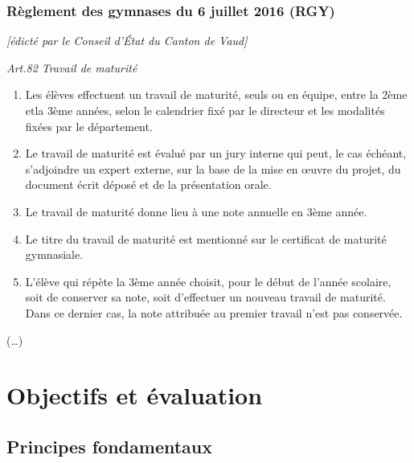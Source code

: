 \documentclass[
  10pt,
  french,
  a5paper,
  openany]{book}
\providecommand{\tightlist}{%
  \setlength{\itemsep}{0pt}\setlength{\parskip}{0pt}}
\begin{document}

\clearpage

\hypertarget{ruxe8glement-des-gymnases-du-6-juillet-2016-rgy}{%
\subsection*{Règlement des gymnases du 6 juillet 2016 (RGY)}\label{ruxe8glement-des-gymnases-du-6-juillet-2016-rgy}}

\emph{{[}édicté par le Conseil d'État du Canton de Vaud{]}}

\emph{Art.82 Travail de maturité}

\begin{enumerate}
\def\labelenumi{\arabic{enumi}.}
\tightlist
\item
  Les élèves effectuent un travail de maturité, seuls ou en équipe, entre la 2ème etla 3ème années, selon le calendrier fixé par le directeur et les modalités fixées par le département.
\item
  Le travail de maturité est évalué par un jury interne qui peut, le cas échéant, s'adjoindre un expert externe, sur la base de la mise en œuvre du projet, du document écrit déposé et de la présentation orale.
\item
  Le travail de maturité donne lieu à une note annuelle en 3ème année.
\item
  Le titre du travail de maturité est mentionné sur le certificat de maturité gymnasiale.
\item
  L'élève qui répète la 3ème année choisit, pour le début de l'année scolaire, soit de conserver sa note, soit d'effectuer un nouveau travail de maturité. Dans ce dernier cas, la note attribuée au premier travail n'est pas conservée.
\end{enumerate}

(\ldots)

\hypertarget{objectifs-et-uxe9valuation}{%
\chapter*{Objectifs et évaluation}\label{objectifs-et-uxe9valuation}}

\hypertarget{principes-fondamentaux}{%
\section*{Principes fondamentaux}\label{principes-fondamentaux}}
\end{document}
